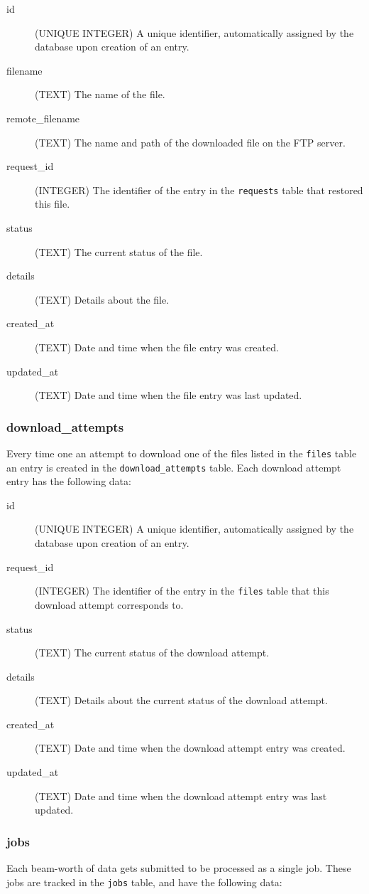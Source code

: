 \begin{description}
    \item[id] (UNIQUE INTEGER)  A unique identifier, automatically assigned by the database upon creation of an entry.
    \item[filename] (TEXT) The name of the file.
    \item[remote\_filename] (TEXT) The name and path of the downloaded file on the FTP server.
    \item[request\_id] (INTEGER) The identifier of the entry in the \texttt{requests} table that restored this file.
    \item[status] (TEXT) The current status of the file.
    \item[details] (TEXT) Details about the file.
    \item[created\_at] (TEXT) Date and time when the file entry was created.
    \item[updated\_at] (TEXT) Date and time when the file entry was last updated.
\end{description}

\subsubsection{download\_attempts}
Every time one an attempt to download one of the files listed in the \texttt{files} table an entry is created in the \texttt{download\_attempts} table. Each download attempt entry has the following data:

\begin{description}
    \item[id] (UNIQUE INTEGER)  A unique identifier, automatically assigned by the database upon creation of an entry.
    \item[request\_id] (INTEGER) The identifier of the entry in the \texttt{files} table that this download attempt corresponds to.
    \item[status] (TEXT) The current status of the download attempt.
    \item[details] (TEXT) Details about the current status of the download attempt.
    \item[created\_at] (TEXT) Date and time when the download attempt entry was created.
    \item[updated\_at] (TEXT) Date and time when the download attempt entry was last updated.
\end{description}

\subsubsection{jobs}
Each beam-worth of data gets submitted to be processed as a single job. These jobs are tracked in the \texttt{jobs} table, and have the following data:

